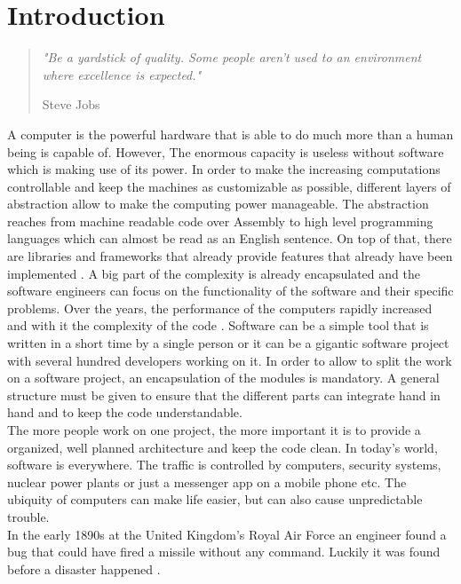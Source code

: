 \chapter{Introduction}

\begin{quote}
\centering 
\em %
"Be a yardstick of quality. Some people aren't used to an environment where excellence is expected."

\medskip
\raggedleft
Steve Jobs
\end{quote}
\vspace{10 mm}

A computer is the powerful hardware that is able to do much more than a human being is capable of. However, The enormous capacity is useless without software which is making use of its power. In order to make the increasing computations controllable and keep the machines as customizable as possible, different layers of abstraction allow to make the computing power manageable. The abstraction reaches from machine readable code over Assembly to high level programming languages which can almost be read as an English sentence. On top of that, there are libraries and frameworks that already provide features that already have been implemented \cite{Martin:2008:CCH:1388398}. A big part of the complexity is already encapsulated and the software engineers can focus on the functionality of the software and their specific problems.
\bigbreak
Over the years, the performance of the computers rapidly increased and with it the complexity of the code \cite{wirth2008brief}.
Software can be a simple tool that is written in a short time by a single person or it can be a gigantic software project with several hundred developers working on it\cite{cusumano1997microsoft}.
In order to allow to split the work on a software project, an encapsulation of the modules is mandatory. A general structure must be given to ensure that the different parts can integrate hand in hand and to keep the code understandable.\\
The more people work on one project, the more important it is to provide a organized, well planned architecture and keep the code clean.
\bigbreak
In today's world, software is everywhere. The traffic is controlled by computers, security systems, nuclear power plants or just a messenger app on a mobile phone etc. 
The ubiquity of computers can make life easier, but can also cause unpredictable trouble.\\
In the early 1890s at the United Kingdom's Royal Air Force an engineer found a bug that could have fired a missile without any command. Luckily it was found before a disaster happened \cite{ross2005exterminators}.
